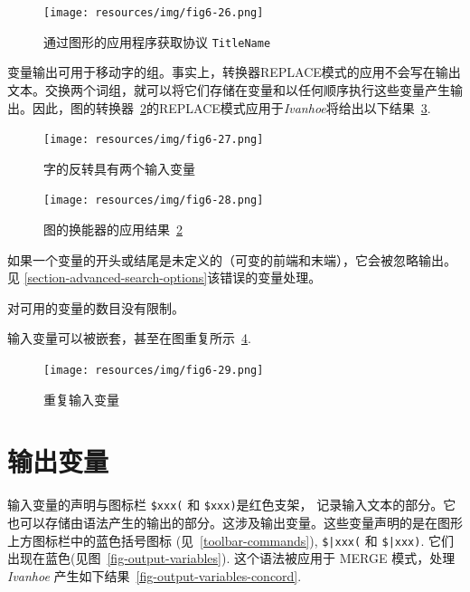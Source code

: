 \begin{figure}[!p]
\begin{center}
\texttt{[image: resources/img/fig6-26.png]}
\caption{通过图形的应用程序获取协议 \texttt{TitleName}\label{fig6-14}}
\end{center}
\end{figure}

\bigskip
\noindent 变量输出可用于移动字的组。事实上，转换器REPLACE模式的应用不会写在输出文本。交换两个词组，就可以将它们存储在变量和以任何顺序执行这些变量产生输出。因此，图的转换器~\ref{fig-swapping-words}的REPLACE模式应用于\textit{Ivanhoe}将给出以下结果~\ref{fig-no-space-problem}.

\begin{figure}[!ht]
\begin{center}
\texttt{[image: resources/img/fig6-27.png]}
\caption{字的反转具有两个输入变量\label{fig-swapping-words}}
\end{center}
\end{figure}

\begin{figure}[!ht]
\begin{center}
\texttt{[image: resources/img/fig6-28.png]}
\caption{图的换能器的应用结果~\ref{fig-swapping-words}\label{fig-no-space-problem}}
\end{center}
\end{figure}

\bigskip
\noindent 如果一个变量的开头或结尾是未定义的（可变的前端和末端），它会被忽略输出。见 \ref{section-advanced-search-options}该错误的变量处理。

\bigskip
\noindent 对可用的变量的数目没有限制。

\bigskip
\noindent    
输入变量可以被嵌套，甚至在图重复所示~\ref{fig-overlapping-variables}.

\begin{figure}[!ht]
\begin{center}
\texttt{[image: resources/img/fig6-29.png]}
\caption{重复输入变量\label{fig-overlapping-variables}}
\end{center}
\end{figure}



\newpage

\section{输出变量}
\label{section-output-variables}
输入变量的声明与图标栏 \verb+$xxx(+ 和 \verb+$xxx)+是红色支架， 记录输入文本的部分。它也可以存储由语法产生的输出的部分。这涉及输出变量。这些变量声明的是在图形上方图标栏中的蓝色括号图标 (见~\ref{toolbar-commands}),
 \verb+$|xxx(+ 和 \verb+$|xxx)+.
它们出现在蓝色(见图~\ref{fig-output-variables}).
这个语法被应用于 MERGE 模式，处理 \textit{Ivanhoe} 产生如下结果~\ref{fig-output-variables-concord}. 

